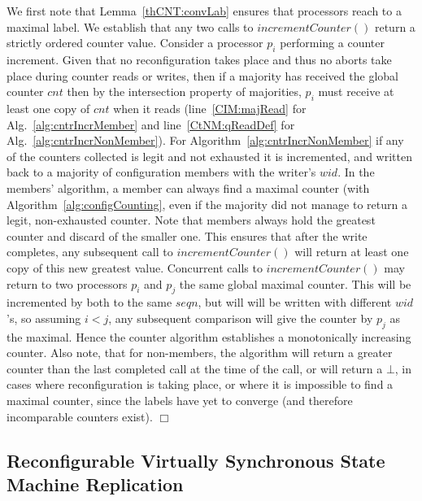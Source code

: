 \documentclass[11pt]{article}
\newenvironment{proof}{\noindent{\bf Proof.}}{\hfill$\Box$}
\begin{document}
\begin{proof}
We first note that Lemma~\ref{thCNT:convLab} ensures that processors reach to a maximal label.
We establish that any two calls to $incrementCounter()$ return a strictly ordered counter value. 
Consider a processor $p_i$ performing a counter increment.
Given that no reconfiguration takes place and thus no aborts take place during counter reads or writes, then if a majority has received the global counter $cnt$ then by the intersection property of majorities, $p_i$ must receive at least one copy of $cnt$ when it reads (line~\ref{CIM:majRead} for Alg.~\ref{alg:cntrIncrMember} and line~\ref{CtNM:qReadDef} for Alg.~\ref{alg:cntrIncrNonMember}).
For Algorithm~\ref{alg:cntrIncrNonMember} if any of the counters collected is legit and not exhausted it is incremented, and written back to a majority of configuration members with the writer's $wid$.
In the members' algorithm, a member can always find a maximal counter (with Algorithm~\ref{alg:configCounting}, even if the majority did not manage to return a legit, non-exhausted counter.
Note that members always hold the greatest counter and discard of the smaller one. 
This ensures that after the write completes, any subsequent call to $incrementCounter()$ will return at least one copy of this new greatest value. 
Concurrent calls to $incrementCounter()$ may return to two processors $p_i$ and $p_j$ the same global maximal counter.
This will be incremented by both to the same $seqn$, but will will be written with different $wid$'s, so assuming $i<j$, any subsequent comparison will give the counter by $p_j$ as the maximal.
Hence the counter algorithm establishes a monotonically increasing counter.
Also note, that for non-members, the algorithm will return a greater counter than the last completed call at the time of the call, or will return a $\bot$, in cases where reconfiguration is taking place, or where it is impossible to find a maximal counter, since the labels have yet to converge (and therefore incomparable counters exist).
\end{proof}





\subsection{Reconfigurable Virtually Synchronous State Machine Replication} 
\label{sec:VS}
\end{document}
